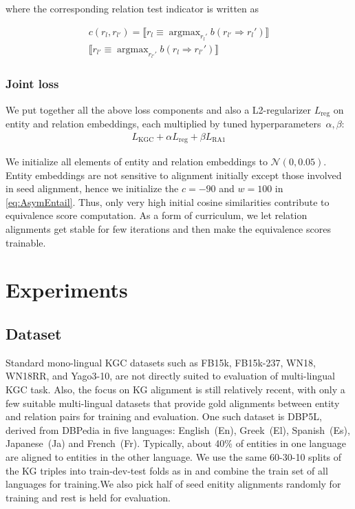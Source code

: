 \documentclass[11pt]{article}
\DeclareMathOperator*{\argmax}{argmax}
\begin{document}
where the corresponding relation test indicator is written as 

\begin{multline}
    c(r_{l},r_{l'}) = 
    \llbracket \textstyle 
    r_{l} \equiv \argmax_{r_{l}'} b(r_{l'} \Rightarrow r_{l}') \rrbracket
    \\[-.5ex] 
    \llbracket \textstyle 
    r_{l'} \equiv \argmax_{r_{l'}'} b(r_{l} \Rightarrow r_{l'}') \rrbracket
\end{multline}

\subsubsection{Joint loss}

We put together all the above loss components and also a L2-regularizer $L_\text{reg}$ on entity and relation embeddings, each multiplied by tuned hyperparameters~$\alpha,\beta$:
\begin{align}
L_\text{KGC} + 
\alpha L_\text{reg} +
\beta L_\text{RA1} 
\end{align}

We initialize all elements of entity and relation embeddings to $\mathcal{N}(0,0.05)$.  Entity embeddings are not sensitive to alignment initially except those involved in seed alignment, hence we initialize the $c=-90$ and $w=100$ in \eqref{eq:AsymEntail}.  Thus, only very high initial cosine similarities contribute to equivalence score computation.  As a form of curriculum, we let relation alignments get stable for few iterations and then make the equivalence scores trainable.
 

\section{Experiments}







\subsection{Dataset}

Standard mono-lingual KGC datasets such as FB15k, FB15k-237, WN18, WN18RR, and Yago3-10, are not directly suited to evaluation of multi-lingual KGC task.
Also, the focus on KG alignment is still relatively recent, with only a few suitable multi-lingual datasets that provide gold alignments between entity and relation pairs for training and evaluation. One such dataset is DBP5L, derived from DBPedia in five languages: English~(En), Greek~(El), Spanish~(Es), Japanese~(Ja) and French~(Fr).   Typically, about  40\% of entities in one language are aligned to entities in the other language. We  use the same 60-30-10 splits of the KG triples into train-dev-test folds as in \citet{chen-etal-2020-multilingual} and combine the train set of all languages for training.We also pick half of seed enitity alignments randomly for training and rest is held for evaluation. 
\end{document}
